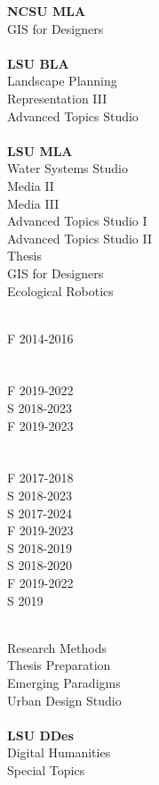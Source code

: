 \documentclass[10pt]{designcv}
\begin{document}


\begin{minipage}[t]{0.3\textwidth} 
\textbf{NCSU MLA}\\
GIS for Designers\\
\ \\
\textbf{LSU BLA}\\
Landscape Planning\\
Representation III\\
Advanced Topics Studio\\
\ \\
\textbf{LSU MLA}\\
Water Systems Studio\\
Media II\\
Media III\\
Advanced Topics Studio I\\
Advanced Topics Studio II\\
Thesis\\
GIS for Designers\\
Ecological Robotics\\
\end{minipage}
\begin{minipage}[t]{0.2\textwidth} 
\ \\
F 2014-2016\\
\ \\
\ \\
F 2019-2022\\
S 2018-2023\\
F 2019-2023\\
\ \\
\ \\
F 2017-2018\\
S 2018-2023\\
S 2017-2024\\
F 2019-2023\\
S 2018-2019\\
S 2018-2020\\
F 2019-2022\\
S 2019\\
\end{minipage}
\begin{minipage}[t]{0.3\textwidth}
\ \\
Research Methods\\
Thesis Preparation\\
Emerging Paradigms\\
Urban Design Studio\\
\ \\
\textbf{LSU DDes}\\
Digital Humanities\\
Special Topics\\
\end{minipage}
\end{document}
